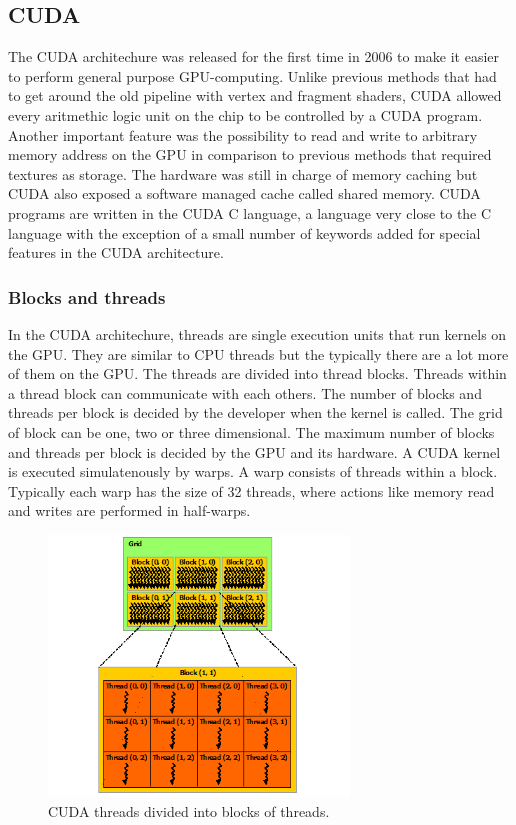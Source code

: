 \newpage
\subsection{CUDA}

The CUDA architechure was released for the first time in 2006 to make it easier to perform general purpose GPU-computing. Unlike previous methods that had to get around the old pipeline with vertex and fragment shaders, CUDA allowed every aritmethic logic unit on the chip to be controlled by a CUDA program. Another important feature was the possibility to read and write to arbitrary memory address on the GPU in comparison to previous methods that required textures as storage. The hardware was still in charge of memory caching but CUDA also exposed a software managed cache called shared memory. CUDA programs are written in the CUDA C language, a language very close to the C language with the exception of a small number of keywords added for special features in the CUDA architecture.  

\subsubsection{Blocks and threads}

In the CUDA architechure, threads are single execution units that run kernels on the GPU. They are similar to CPU threads but the typically there are a lot more of them on the GPU. The threads are divided into thread blocks. Threads within a thread block can communicate with each others. The number of blocks and threads per block is decided by the developer when the kernel is called. The grid of block can be one, two or three dimensional. The maximum number of blocks and threads per block is decided by the GPU and its hardware. A CUDA kernel is executed simulatenously by warps. A warp consists of threads within a block. Typically each warp has the size of 32 threads, where actions like memory read and writes are performed in half-warps. 
\newline

\begin{figure}[ht!]
\centering
\includegraphics[width=80mm]{img/grid-of-thread-blocks.png}
\caption{CUDA threads divided into blocks of threads.}
\label{cudablockthreads}
\end{figure}

